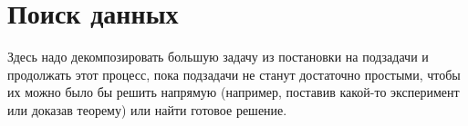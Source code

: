 \section{Поиск данных}
\label{sec:Chapter3} 
Здесь надо декомпозировать большую задачу из постановки на подзадачи и продолжать этот процесс, пока подзадачи не станут достаточно простыми, чтобы их можно было бы решить напрямую (например, поставив какой-то эксперимент или доказав теорему) или найти готовое решение.

\newpage
